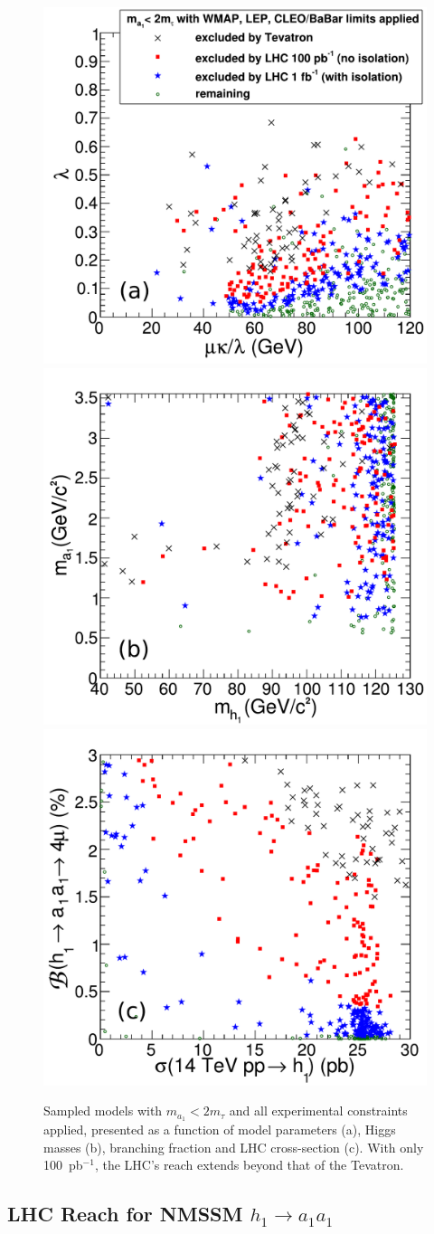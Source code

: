 \documentclass[aps,prl,twocolumn,nofootinbib,superscriptaddress]{revtex4}
\begin{document}
\begin{figure}[htbp]
\includegraphics[width=0.32\linewidth]{plots/newlhcconstraints_params}
\hfill
\includegraphics[width=0.32\linewidth]{plots/newlhcconstraints_masses}
\hfill
\includegraphics[width=0.32\linewidth]{plots/newlhcconstraints_crosbr}

\caption{Sampled models with $m_{a_1} < 2m_\tau$ and all experimental
  constraints applied, presented as a function of model parameters
  (a), Higgs masses (b), branching fraction and LHC cross-section (c).
  With only 100~pb$^{-1}$, the LHC's reach extends beyond that of the
  Tevatron. \label{fig:lhcexclusion}}
\end{figure}

\subsection{LHC Reach for NMSSM $h_1 \to a_1 a_1$}
\end{document}
